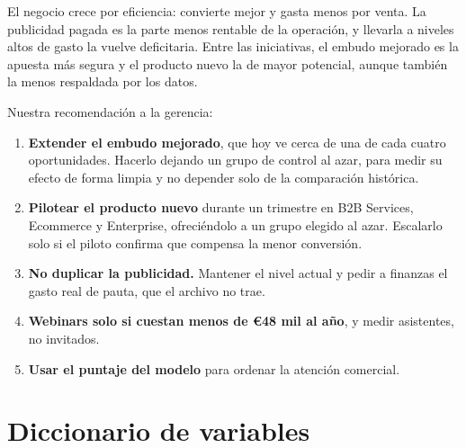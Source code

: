 \documentclass[11pt,letterpaper]{article}
\begin{document}
El negocio crece por eficiencia: convierte mejor y gasta menos por venta. La publicidad pagada es la parte menos
rentable de la operación, y llevarla a niveles altos de gasto la vuelve deficitaria. Entre las iniciativas, el
embudo mejorado es la apuesta más segura y el producto nuevo la de mayor potencial, aunque también la menos
respaldada por los datos.

Nuestra recomendación a la gerencia:

\begin{enumerate}
  \item \textbf{Extender el embudo mejorado}, que hoy ve cerca de una de cada cuatro oportunidades. Hacerlo
        dejando un grupo de control al azar, para medir su efecto de forma limpia y no depender solo de la
        comparación histórica.
  \item \textbf{Pilotear el producto nuevo} durante un trimestre en B2B Services, Ecommerce y Enterprise,
        ofreciéndolo a un grupo elegido al azar. Escalarlo solo si el piloto confirma que compensa la menor
        conversión.
  \item \textbf{No duplicar la publicidad.} Mantener el nivel actual y pedir a finanzas el gasto real de pauta,
        que el archivo no trae.
  \item \textbf{Webinars solo si cuestan menos de €48 mil al año}, y medir asistentes, no invitados.
  \item \textbf{Usar el puntaje del modelo} para ordenar la atención comercial.
\end{enumerate}

\newpage
\appendix
\section{Diccionario de variables}
\label{anx:diccionario}
\end{document}
